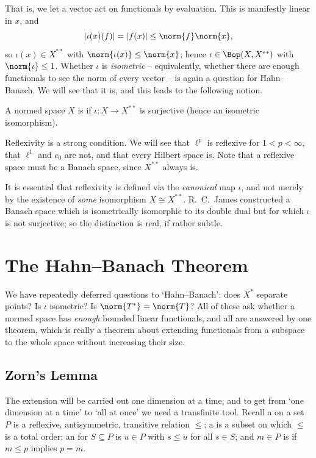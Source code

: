 That is, we let a vector act on functionals by evaluation. This is manifestly linear in $x$, and
$$|\iota(x)(f)| = |f(x)| \leq \norm{f}\norm{x},$$
so $\iota(x) \in X^{**}$ with $\norm{\iota(x)} \leq \norm{x}$; hence $\iota \in \Bop(X, X^{**})$ with $\norm{\iota} \leq 1$. Whether $\iota$ is \emph{isometric} -- equivalently, whether there are enough functionals to see the norm of every vector -- is again a question for Hahn--Banach. We will see that it is, and this leads to the following notion.

\begin{definition}[Reflexive]
	A normed space $X$ is  if $\iota : X \to X^{**}$ is surjective (hence an isometric isomorphism).
\end{definition}

Reflexivity is a strong condition. We will see that $\ell^p$ is reflexive for $1 < p < \infty$, that $\ell^1$ and $c_0$ are not, and that every Hilbert space is. Note that a reflexive space must be a Banach space, since $X^{**}$ always is.

\begin{remark}
	It is essential that reflexivity is defined via the \emph{canonical} map $\iota$, and not merely by the existence of \emph{some} isomorphism $X \cong X^{**}$. R.\ C.\ James constructed a Banach space which is isometrically isomorphic to its double dual but for which $\iota$ is not surjective; so the distinction is real, if rather subtle.
\end{remark}

\section{The Hahn--Banach Theorem}

We have repeatedly deferred questions to `Hahn--Banach': does $X^*$ separate points? Is $\iota$ isometric? Is $\norm{T^*} = \norm{T}$? All of these ask whether a normed space has \emph{enough} bounded linear functionals, and all are answered by one theorem, which is really a theorem about extending functionals from a subspace to the whole space without increasing their size.

\subsection{Zorn's Lemma}

The extension will be carried out one dimension at a time, and to get from `one dimension at a time' to `all at once' we need a transfinite tool. Recall a  on a set $P$ is a reflexive, antisymmetric, transitive relation $\leq$; a  is a subset on which $\leq$ is a total order; an  for $S \subseteq P$ is $u \in P$ with $s \leq u$ for all $s \in S$; and $m \in P$ is  if $m \leq p$ implies $p = m$.

